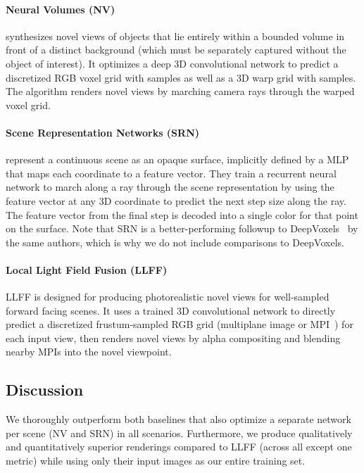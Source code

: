 \documentclass[runningheads]{llncs}
\begin{document}
\paragraph{\textbf{Neural Volumes (NV)}~\cite{neuralvolumes}}
synthesizes novel views of objects that lie entirely within a bounded volume in front of a distinct background (which must be separately captured without the object of interest). It optimizes a deep 3D convolutional network to predict a discretized RGB voxel grid with  samples as well as a 3D warp grid with  samples. The algorithm renders novel views by marching camera rays through the warped voxel grid. 

\paragraph{\textbf{Scene Representation Networks (SRN)}~\cite{srn}}
represent a continuous scene as an opaque surface, implicitly defined by a MLP that maps each  coordinate to a feature vector. They train a recurrent neural network to march along a ray through the scene representation by using the feature vector at any 3D coordinate to predict the next step size along the ray. The feature vector from the final step is decoded into a single color for that point on the surface. Note that SRN is a better-performing followup to DeepVoxels~\cite{deepvoxels} by the same authors, which is why we do not include comparisons to DeepVoxels.

\paragraph{\textbf{Local Light Field Fusion (LLFF)}~\cite{mildenhall19}}
LLFF is designed for producing photorealistic novel views for well-sampled forward facing scenes. It uses a trained 3D convolutional network to directly predict a discretized frustum-sampled RGB grid (multiplane image or MPI~\cite{zhou18}) for each input view, then renders novel views by alpha compositing and blending nearby MPIs into the novel viewpoint. 


\subsection{Discussion}

We thoroughly outperform both baselines that also optimize a separate network per scene (NV and SRN) in all scenarios.
Furthermore, we produce qualitatively and quantitatively superior renderings compared to LLFF (across all except one metric) while using only their input images as our entire training set.
\end{document}
